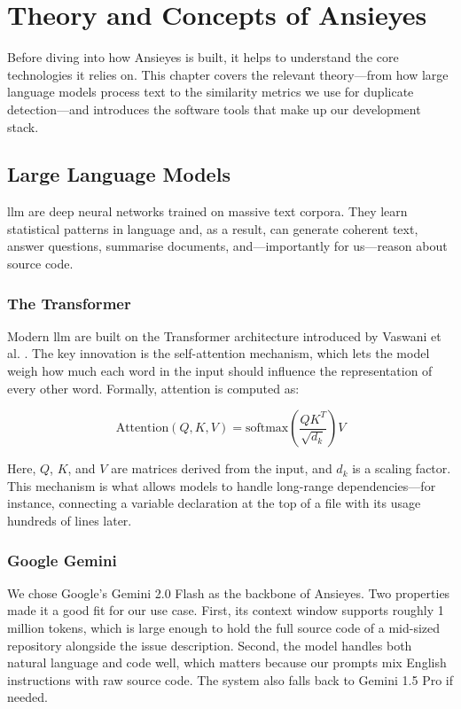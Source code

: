 \chapter{Theory and Concepts of Ansieyes}

Before diving into how Ansieyes is built, it helps to understand the core technologies it relies on. This chapter covers the relevant theory---from how large language models process text to the similarity metrics we use for duplicate detection---and introduces the software tools that make up our development stack.

\section{Large Language Models}

\gls{llm} are deep neural networks trained on massive text corpora. They learn statistical patterns in language and, as a result, can generate coherent text, answer questions, summarise documents, and---importantly for us---reason about source code.

\subsection{The Transformer}
Modern \gls{llm} are built on the Transformer architecture introduced by Vaswani et al. \cite{Vaswani2017}. The key innovation is the self-attention mechanism, which lets the model weigh how much each word in the input should influence the representation of every other word. Formally, attention is computed as:

\begin{equation}
\label{eqn:attention}
\text{Attention}(Q, K, V) = \text{softmax}\left(\frac{QK^T}{\sqrt{d_k}}\right)V
\end{equation}

Here, $Q$, $K$, and $V$ are matrices derived from the input, and $d_k$ is a scaling factor. This mechanism is what allows models to handle long-range dependencies---for instance, connecting a variable declaration at the top of a file with its usage hundreds of lines later.

\subsection{Google Gemini}
We chose Google's Gemini 2.0 Flash as the backbone of Ansieyes. Two properties made it a good fit for our use case. First, its context window supports roughly 1 million tokens, which is large enough to hold the full source code of a mid-sized repository alongside the issue description. Second, the model handles both natural language and code well, which matters because our prompts mix English instructions with raw source code. The system also falls back to Gemini 1.5 Pro if needed.

